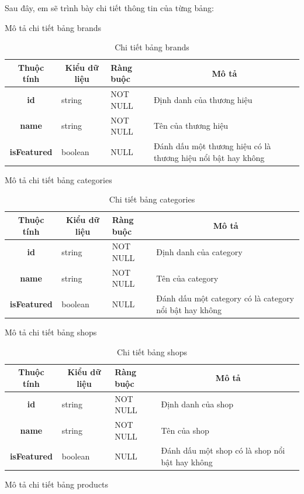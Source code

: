 \documentclass[../DoAn.tex]{subfiles}
\begin{document}
Sau đây, em sẽ trình bày chi tiết thông tin của từng bảng:

Mô tả chi tiết bảng brands

\begin{table}[H]
\centering
\begin{tabular}{|c|l|l|p{6cm}|}
\hline
\textbf{Thuộc tính} & \multicolumn{1}{c|}{\textbf{Kiểu dữ liệu}} & \textbf{Ràng buộc} & \multicolumn{1}{c|}{\textbf{Mô tả}} \\ \hline
\textbf{id} & string & NOT NULL & Định danh của thương hiệu \\ \hline
\textbf{name} & string & NOT NULL & Tên của thương hiệu \\ \hline
\textbf{isFeatured} & boolean & NULL & Đánh dấu một thương hiệu có là thương hiệu nổi bật hay không \\ \hline
\end{tabular}
\caption{Chi tiết bảng brands}
\label{tab:brandsTable}
\end{table}

Mô tả chi tiết bảng categories

\begin{table}[H]
\centering
\begin{tabular}{|c|l|l|p{6cm}|}
\hline
\textbf{Thuộc tính} & \multicolumn{1}{c|}{\textbf{Kiểu dữ liệu}} & \textbf{Ràng buộc} & \multicolumn{1}{c|}{\textbf{Mô tả}} \\ \hline
\textbf{id} & string & NOT NULL & Định danh của category \\ \hline
\textbf{name} & string & NOT NULL & Tên của category \\ \hline
\textbf{isFeatured} & boolean & NULL & Đánh dấu một category có là category nổi bật hay không \\ \hline
\end{tabular}
\caption{Chi tiết bảng categories}
\label{tab:categoriesTable}
\end{table}

Mô tả chi tiết bảng shops

\begin{table}[H]
\centering
\begin{tabular}{|c|l|l|p{6cm}|}
\hline
\textbf{Thuộc tính} & \multicolumn{1}{c|}{\textbf{Kiểu dữ liệu}} & \textbf{Ràng buộc} & \multicolumn{1}{c|}{\textbf{Mô tả}} \\ \hline
\textbf{id} & string & NOT NULL & Định danh của shop \\ \hline
\textbf{name} & string & NOT NULL & Tên của shop \\ \hline
\textbf{isFeatured} & boolean & NULL & Đánh dấu một shop có là shop nổi bật hay không \\ \hline
\end{tabular}
\caption{Chi tiết bảng shops}
\label{tab:shopsTable}
\end{table}
Mô tả chi tiết bảng products
\end{document}
